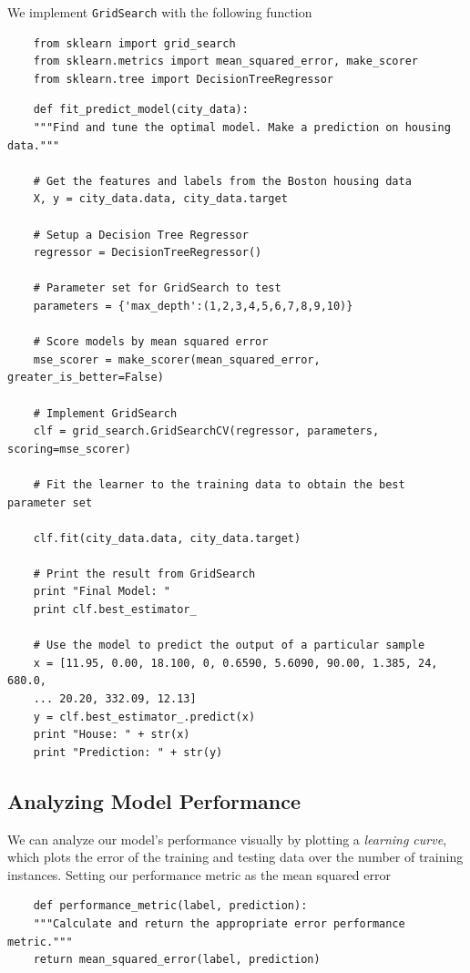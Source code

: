 \documentclass[12 pt]{article}
\numberwithin{equation}{section}
\begin{document}
We implement \texttt{GridSearch} with the following function 
\begin{verbatim}
	from sklearn import grid_search
	from sklearn.metrics import mean_squared_error, make_scorer
	from sklearn.tree import DecisionTreeRegressor
\end{verbatim}
\begin{verbatim}
	def fit_predict_model(city_data):
    """Find and tune the optimal model. Make a prediction on housing data."""

    # Get the features and labels from the Boston housing data
    X, y = city_data.data, city_data.target

    # Setup a Decision Tree Regressor
    regressor = DecisionTreeRegressor()
	
	# Parameter set for GridSearch to test 
    parameters = {'max_depth':(1,2,3,4,5,6,7,8,9,10)}
    
    # Score models by mean squared error
    mse_scorer = make_scorer(mean_squared_error, greater_is_better=False)
    
    # Implement GridSearch
    clf = grid_search.GridSearchCV(regressor, parameters, scoring=mse_scorer)
    
    # Fit the learner to the training data to obtain the best parameter set
   
    clf.fit(city_data.data, city_data.target)
    
    # Print the result from GridSearch
    print "Final Model: "
    print clf.best_estimator_
    
    # Use the model to predict the output of a particular sample
    x = [11.95, 0.00, 18.100, 0, 0.6590, 5.6090, 90.00, 1.385, 24, 680.0, 
    ... 20.20, 332.09, 12.13]
    y = clf.best_estimator_.predict(x)
    print "House: " + str(x)
    print "Prediction: " + str(y)
\end{verbatim}

\subsection{Analyzing Model Performance}
We can analyze our model's performance visually by plotting a \emph{learning curve}, which plots the error of the training and testing data over the number of training instances. Setting our performance metric as the mean squared error

\begin{verbatim}
	def performance_metric(label, prediction):
    """Calculate and return the appropriate error performance metric."""
    return mean_squared_error(label, prediction)
\end{verbatim}
\end{document}
